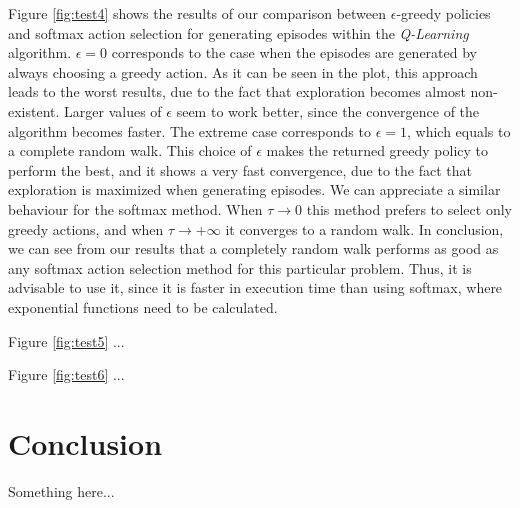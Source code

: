 \documentclass[a4paper,10pt]{article}
\begin{document}
Figure \ref{fig:test4} shows the results of our comparison between $\epsilon$-greedy policies and softmax action selection for generating episodes within the \textit{Q-Learning} algorithm. $\epsilon = 0$ corresponds to the case when the episodes are generated by always choosing a greedy action. As it can be seen in the plot, this approach leads to the worst results, due to the fact that exploration becomes almost non-existent. Larger values of $\epsilon$ seem to work better, since the convergence of the algorithm becomes faster. The extreme case corresponds to $\epsilon = 1$, which equals to a complete random walk. This choice of $\epsilon$ makes the returned greedy policy to perform the best, and it shows a very fast convergence, due to the fact that exploration is maximized when generating episodes. We can appreciate a similar behaviour for the softmax method. When $\tau \rightarrow 0$ this method prefers to select only greedy actions, and when $\tau \rightarrow + \infty$ it converges to a random walk. In conclusion, we can see from our results that a completely random walk performs as good as any softmax action selection method for this particular problem. Thus, it is advisable to use it, since it is faster in execution time than using softmax, where exponential functions need to be calculated.

Figure \ref{fig:test5} ...

Figure \ref{fig:test6} ...

\section{Conclusion}

Something here...

\thebibliography{}
\end{document}
